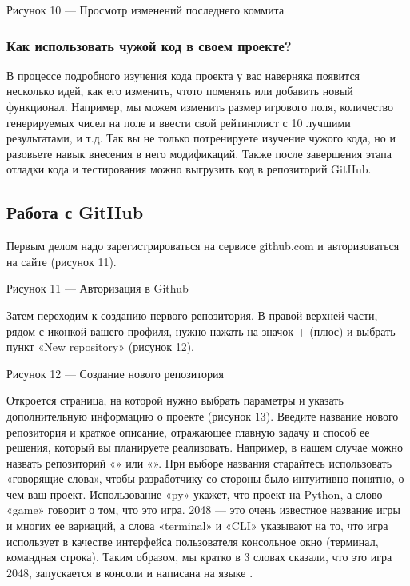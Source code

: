 \documentclass[letterpaper,10pt,russian]{sphinxmanual}
\begin{document}
\sphinxAtStartPar
{}

\sphinxAtStartPar
Рисунок 10 — Просмотр изменений последнего коммита


\subsubsection{Как использовать чужой код в своем проекте?}
\label{\detokenize{educational_materials/github/content:id5}}
\sphinxAtStartPar
В процессе подробного изучения кода проекта у вас наверняка появится несколько идей, как его изменить, что\sphinxhyphen{}то поменять или добавить новый функционал. Например, мы можем изменить размер игрового поля, количество генерируемых чисел на поле и ввести свой рейтинг\sphinxhyphen{}лист с 10 лучшими результатами, и т.д. Так вы не только потренируете изучение чужого кода, но и разовьете навык внесения в него модификаций. Также после завершения этапа отладки кода и тестирования можно выгрузить код в репозиторий GitHub.


\subsection{Работа с GitHub}
\label{\detokenize{educational_materials/github/content:id6}}
\sphinxAtStartPar
Первым делом надо зарегистрироваться на сервисе github.com и авторизоваться на сайте (рисунок 11).

\sphinxAtStartPar
{}

\sphinxAtStartPar
Рисунок 11 — Авторизация в Github

\sphinxAtStartPar
Затем переходим к созданию первого репозитория. В правой верхней части, рядом с иконкой вашего профиля, нужно нажать на значок + (плюс) и выбрать пункт «New repository» (рисунок 12).

\sphinxAtStartPar
{}

\sphinxAtStartPar
Рисунок 12 — Создание нового репозитория

\sphinxAtStartPar
Откроется страница, на которой нужно выбрать параметры и указать дополнительную информацию о проекте (рисунок 13). Введите название нового репозитория и краткое описание, отражающее главную задачу и способ ее решения, который вы планируете реализовать. Например, в нашем случае можно назвать репозиторий «» или «». При выборе названия старайтесь использовать «говорящие слова», чтобы разработчику со стороны было интуитивно понятно, о чем ваш проект. Использование «py» укажет, что проект на Python, а слово «game» говорит о том, что это игра. 2048 — это очень известное название игры и многих ее вариаций, а слова «terminal» и «CLI» указывают на то, что игра использует в качестве интерфейса пользователя консольное окно (терминал, командная строка). Таким образом, мы кратко в 3 словах сказали, что это игра 2048, запускается в консоли и написана на языке .
\end{document}
